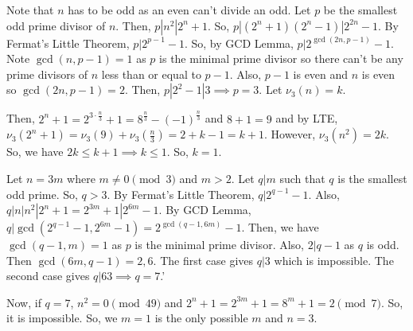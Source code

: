 \documentclass[11pt]{article}
\begin{document}
\begin{sol}
Note that $n$ has to be odd as an even can't divide an odd. Let $p$ be the smallest odd prime divisor of $n$. Then, $p|n^2|2^{n}+1$. So, $p|(2^{n}+1)(2^{n}-1)|2^{2n}-1$. By Fermat's Little Theorem, $p|2^{p-1}-1$. So, by GCD Lemma, $p|2^{\gcd(2n,p-1)}-1$. Note $\gcd(n,p-1)=1$ as $p$ is the minimal prime divisor so there can't be any prime divisors of $n$ less than or equal to $p-1$. Also, $p-1$ is even and $n$ is even so $\gcd(2n,p-1)=2$. Then, $p|2^{2}-1|3\implies p=3$. Let $\nu_{3}(n)=k$.

Then, $2^{n}+1=2^{3\cdot \frac{n}{3}}+1=8^{\frac{n}{3}}-(-1)^{\frac{n}{3}}$ and $8+1=9$ and by LTE, $\nu_{3}(2^{n}+1)=\nu_{3}(9)+\nu_{3}(\frac{n}{3})=2+k-1=k+1$. However, $\nu_{3}(n^2)=2k$. So, we have $2k\leq k+1\implies k\leq 1$. So, $k=1$.

Let $n=3m$ where $m\neq 0\pmod{3}$ and $m>2$. Let $q|m$ such that $q$ is the smallest odd prime. So, $q>3$. By Fermat's Little Theorem, $q|2^{q-1}-1$. Also, $q|n|n^2|2^{n}+1=2^{3m}+1|2^{6m}-1$. By GCD Lemma, $q|\gcd(2^{q-1}-1, 2^{6m}-1)=2^{\gcd(q-1,6m)}-1$. Then, we have $\gcd(q-1,m)=1$ as $p$ is the minimal prime divisor. Also,  $2|q-1$ as $q$ is odd. Then $\gcd(6m,q-1)=2,6$. The first case gives $q|3$ which is impossible. The second case gives $q|63\implies q=7$.'

Now, if $q=7$, $n^2=0\pmod{49}$ and $2^{n}+1=2^{3m}+1=8^{m}+1=2\pmod{7}$. So, it is impossible. So, we $m=1$ is the only possible $m$ and $n=3$.
\end{sol}


\end{document}
